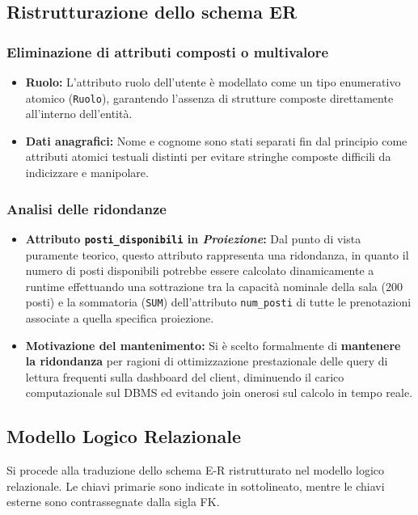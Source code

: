 \documentclass[12pt, a4paper]{article}
\begin{document}
\subsection{Ristrutturazione dello schema ER}

\subsubsection{Eliminazione di attributi composti o multivalore}
\begin{itemize}
    \item \textbf{Ruolo:} L'attributo ruolo dell'utente è modellato come un tipo enumerativo atomico (\texttt{Ruolo}), garantendo l'assenza di strutture composte direttamente all'interno dell'entità.
    \item \textbf{Dati anagrafici:} Nome e cognome sono stati separati fin dal principio come attributi atomici testuali distinti per evitare stringhe composte difficili da indicizzare e manipolare.
\end{itemize}

\subsubsection{Analisi delle ridondanze}
\begin{itemize}
    \item \textbf{Attributo \texttt{posti\_disponibili} in \textit{Proiezione}:} Dal punto di vista puramente teorico, questo attributo rappresenta una ridondanza, in quanto il numero di posti disponibili potrebbe essere calcolato dinamicamente a runtime effettuando una sottrazione tra la capacità nominale della sala (200 posti) e la sommatoria (\texttt{SUM}) dell'attributo \texttt{num\_posti} di tutte le prenotazioni associate a quella specifica proiezione.
    \item \textbf{Motivazione del mantenimento:} Si è scelto formalmente di \textbf{mantenere la ridondanza} per ragioni di ottimizzazione prestazionale delle query di lettura frequenti sulla dashboard del client, diminuendo il carico computazionale sul DBMS ed evitando join onerosi sul calcolo in tempo reale.
\end{itemize}

\subsection{Modello Logico Relazionale}
Si procede alla traduzione dello schema E-R ristrutturato nel modello logico relazionale. Le chiavi primarie sono indicate in sottolineato, mentre le chiavi esterne sono contrassegnate dalla sigla FK.
\end{document}
